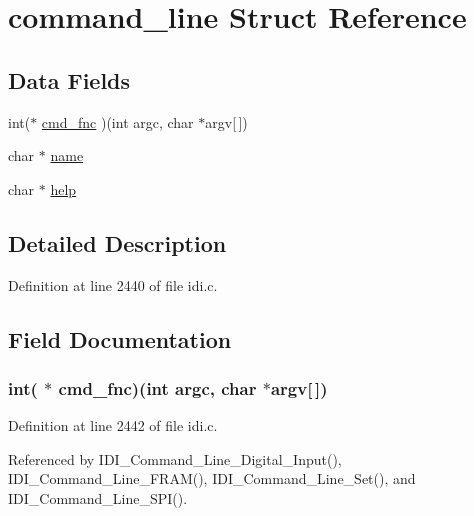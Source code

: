 \hypertarget{structcommand__line}{\section{command\+\_\+line Struct Reference}
\label{structcommand__line}
}
\subsection*{Data Fields}
\begin{DoxyCompactItemize}
\item 
int($\ast$ \hyperlink{structcommand__line_a62417f2e64cfcb563974afad3cd84c8f}{cmd\+\_\+fnc} )(int argc, char $\ast$argv\mbox{[}$\,$\mbox{]})
\item 
char $\ast$ \hyperlink{structcommand__line_a5ac083a645d964373f022d03df4849c8}{name}
\item 
char $\ast$ \hyperlink{structcommand__line_a67b7e976c6444c3d7fab151527bdae33}{help}
\end{DoxyCompactItemize}


\subsection{Detailed Description}


Definition at line 2440 of file idi.\+c.



\subsection{Field Documentation}
\hypertarget{structcommand__line_a62417f2e64cfcb563974afad3cd84c8f}{
\subsubsection[{cmd\+\_\+fnc}]{\setlength{\rightskip}{0pt plus 5cm}int( $\ast$  cmd\+\_\+fnc)(int argc, char $\ast$argv\mbox{[}$\,$\mbox{]})}}\label{structcommand__line_a62417f2e64cfcb563974afad3cd84c8f}


Definition at line 2442 of file idi.\+c.



Referenced by I\+D\+I\+\_\+\+Command\+\_\+\+Line\+\_\+\+Digital\+\_\+\+Input(), I\+D\+I\+\_\+\+Command\+\_\+\+Line\+\_\+\+F\+R\+A\+M(), I\+D\+I\+\_\+\+Command\+\_\+\+Line\+\_\+\+Set(), and I\+D\+I\+\_\+\+Command\+\_\+\+Line\+\_\+\+S\+P\+I().

